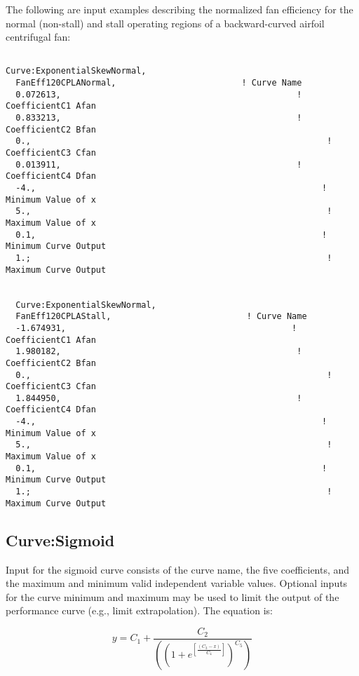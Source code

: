 The following are input examples describing the normalized fan efficiency for the normal (non-stall) and stall operating regions of a backward-curved airfoil centrifugal fan:

\begin{lstlisting}

Curve:ExponentialSkewNormal,
  FanEff120CPLANormal,                         ! Curve Name
  0.072613,                                               ! CoefficientC1 Afan
  0.833213,                                               ! CoefficientC2 Bfan
  0.,                                                           ! CoefficientC3 Cfan
  0.013911,                                               ! CoefficientC4 Dfan
  -4.,                                                         ! Minimum Value of x
  5.,                                                           ! Maximum Value of x
  0.1,                                                         ! Minimum Curve Output
  1.;                                                           ! Maximum Curve Output


  Curve:ExponentialSkewNormal,
  FanEff120CPLAStall,                           ! Curve Name
  -1.674931,                                             ! CoefficientC1 Afan
  1.980182,                                               ! CoefficientC2 Bfan
  0.,                                                           ! CoefficientC3 Cfan
  1.844950,                                               ! CoefficientC4 Dfan
  -4.,                                                         ! Minimum Value of x
  5.,                                                           ! Maximum Value of x
  0.1,                                                         ! Minimum Curve Output
  1.;                                                           ! Maximum Curve Output
\end{lstlisting}

\subsection{Curve:Sigmoid}\label{curvesigmoid}

Input for the sigmoid curve consists of the curve name, the five coefficients, and the maximum and minimum valid independent variable values. Optional inputs for the curve minimum and maximum may be used to limit the output of the performance curve (e.g., limit extrapolation). The equation is:

\begin{equation}
y = {C_1} + \frac{{{C_2}}}{{\left( {{{(1 + {e^{\left[ {\frac{{({C_3} - x)}}{{{C_4}}}} \right]}})}^{{C_5}}}} \right)}}
\end{equation}

